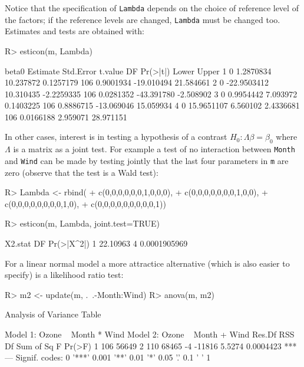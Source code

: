 \documentclass[11pt]{article}
\def\code#1{\texttt{#1}}
\begin{document}
Notice that the specification of \code{Lambda} depends on the choice
of reference level of the factors; if the reference levels are
changed, \code{Lambda} must be changed too. Estimates and tests are
obtained with:

\begin{Schunk}
\begin{Sinput}
R> esticon(m, Lambda)
\end{Sinput}
\begin{Soutput}
  beta0    Estimate Std.Error    t.value  DF  Pr(>|t|)      Lower     Upper
1     0   1.2870834 10.237872  0.1257179 106 0.9001934 -19.010494 21.584661
2     0 -22.9503412 10.310435 -2.2259335 106 0.0281352 -43.391780 -2.508902
3     0   0.9954442  7.093972  0.1403225 106 0.8886715 -13.069046 15.059934
4     0  15.9651107  6.560102  2.4336681 106 0.0166188   2.959071 28.971151
\end{Soutput}
\end{Schunk}

In other cases, interest is in testing a hypothesis of a contrast
$H_0: \Lambda \beta=\beta_0$ where $\Lambda$ is a matrix as a joint test. For example
a test of no interaction between \code{Month} and \code{Wind} can be
made by testing jointly that the last four parameters in \code{m} are
zero (observe that the test is a Wald test):
\begin{Schunk}
\begin{Sinput}
R> Lambda <- rbind(
+    c(0,0,0,0,0,0,1,0,0,0),
+    c(0,0,0,0,0,0,0,1,0,0),
+    c(0,0,0,0,0,0,0,0,1,0),
+    c(0,0,0,0,0,0,0,0,0,1))
\end{Sinput}
\end{Schunk}


\begin{Schunk}
\begin{Sinput}
R> esticon(m, Lambda, joint.test=TRUE)
\end{Sinput}
\begin{Soutput}
   X2.stat DF   Pr(>|X^2|)
1 22.10963  4 0.0001905969
\end{Soutput}
\end{Schunk}

For a linear normal model a more attractice alternative (which is also
easier to specify) is a likelihood ratio test:

\begin{Schunk}
\begin{Sinput}
R> m2 <- update(m, .~.-Month:Wind)
R> anova(m, m2)
\end{Sinput}
\begin{Soutput}
Analysis of Variance Table

Model 1: Ozone ~ Month * Wind
Model 2: Ozone ~ Month + Wind
  Res.Df   RSS Df Sum of Sq      F    Pr(>F)    
1    106 56649                                  
2    110 68465 -4    -11816 5.5274 0.0004423 ***
---
Signif. codes:  0 '***' 0.001 '**' 0.01 '*' 0.05 '.' 0.1 ' ' 1 
\end{Soutput}
\end{Schunk}
\end{document}
